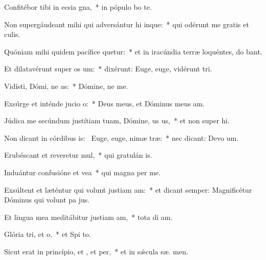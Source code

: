 \item Confitébor tibi in ecsia gna,~* in pópulo  bo te.
\item Non supergáudeant mihi qui adversántur hi inque:~* qui odérunt me gratis et  culis.
\item Quóniam mihi quidem pacífice quetur:~* et in iracúndia terræ loquéntes, do bant.
\item Et dilatavérunt super  os um:~* dixérunt: Euge, euge, vidérunt  tri.
\item Vidísti, Dómi, ne as:~* Dómine, ne   me.
\item Exsúrge et inténde jucio o:~* Deus meus, et Dóminus meus   am.
\item Júdica me secúndum justítiam tuam, Dómine, us us,~* et non super hi.
\item Non dicant in córdibus is:~\pscross{} Euge, euge, nimæ træ:~* nec dicant: Devo um.
\item Erubéscant et reveretur mul,~* qui gratulán  is.
\item Induántur confusióne et vea~* qui magna  per me.
\item Exsúltent et læténtur qui volunt justiam am:~* et dicant semper: Magnificétur Dóminus qui volunt pa  jus.
\item Et lingua mea meditábitur justiam am,~* tota di  am.
\item Glória tri, et o,~* et Spi to.
\item Sicut erat in princípio, et , et per,~* et in sǽcula sæ. men.
